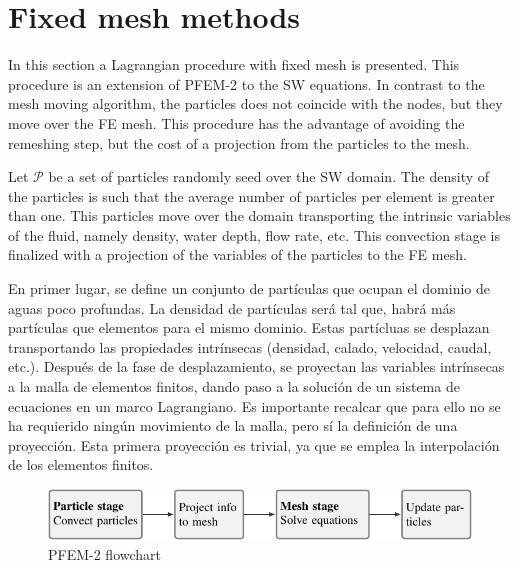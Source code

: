 \section{Fixed mesh methods}


In this section a Lagrangian procedure with fixed mesh is presented. This procedure is an extension of PFEM-2 \cite{idelsohn2012} to the SW equations. In contrast to the mesh moving algorithm, the particles does not coincide with the nodes, but they move over the FE mesh. This procedure has the advantage of avoiding the remeshing step, but the cost of a projection from the particles to the mesh.

Let $\mathcal{P}$ be a set of particles randomly seed over the SW domain. The density of the particles is such that the average number of particles per element is greater than one. This particles move over the domain transporting the intrinsic variables of the fluid, namely density, water depth, flow rate, etc. This convection stage is finalized with a projection of the variables of the particles to the FE mesh.


En primer lugar, se define un conjunto de partículas que ocupan el dominio de aguas poco profundas. La densidad de partículas será tal que, habrá más partículas que elementos para el mismo dominio. Estas partícluas se desplazan transportando las propiedades intrínsecas (densidad, calado, velocidad, caudal, etc.). Después de la fase de desplazamiento, se proyectan las variables intrínsecas a la malla de elementos finitos, dando paso a la solución de un sistema de ecuaciones en un marco Lagrangiano. Es importante recalcar que para ello no se ha requierido ningún movimiento de la malla, pero sí la definición de una proyección. Esta primera proyección es trivial, ya que se emplea la interpolación de los elementos finitos.

\begin{figure}
    \centering
    \includegraphics[width=\textwidth]{img/lagrangian/pfem2_stage_flowchart.pdf}
    \caption{PFEM-2 flowchart}
    \label{pfem2_stage_flowchart}
\end{figure}


